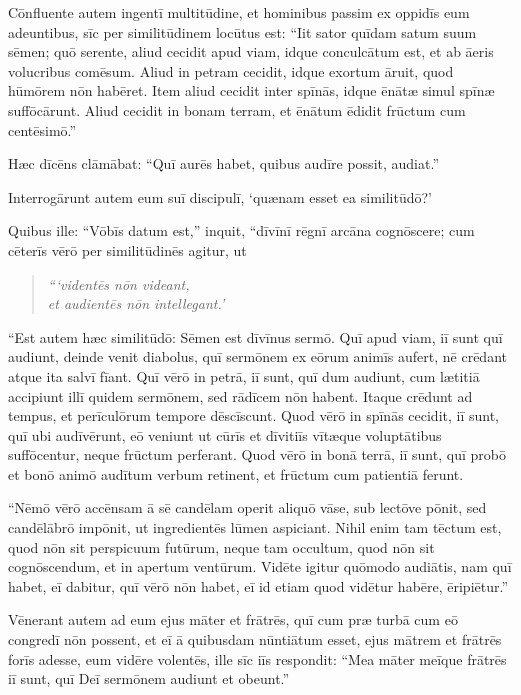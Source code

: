 \Versus Cōnfluente autem ingentī multitūdine, et hominibus passim ex oppidīs eum adeuntibus, sīc per similitūdinem locūtus est:
\Versus ``Iit sator quīdam satum suum sēmen; quō serente, aliud cecidit apud viam, idque conculcātum est, et ab āeris volucribus comēsum.
\Versus Aliud in petram cecidit, idque exortum āruit, quod hūmōrem nōn habēret.
\Versus Item aliud cecidit inter spīnās, idque ēnātæ simul spīnæ suffōcārunt.
\Versus Aliud cecidit in bonam terram, et ēnātum ēdidit frūctum cum centēsimō.''

Hæc dīcēns clāmābat: ``Quī aurēs habet, quibus audīre possit, audiat.''

\Versus Interrogārunt autem eum suī discipulī, `quænam esset ea similitūdō?'

\Versus Quibus ille: ``Vōbīs datum est,'' inquit, ``dīvīnī rēgnī arcāna cognōscere; cum cēterīs vērō per similitūdinēs agitur, ut
\begin{verse}
\begin{patverse*}
\emph{``{}`videntēs nōn videant,\\
et audientēs nōn intellegant.'}
\end{patverse*}
\end{verse}

\Versus ``Est autem hæc similitūdō: Sēmen est dīvīnus sermō.
\Versus Quī apud viam, iī sunt quī audiunt, deinde venit diabolus, quī sermōnem ex eōrum animīs aufert, nē crēdant atque ita salvī fīant.
\Versus Quī vērō in petrā, iī sunt, quī dum audiunt, cum lætitiā accipiunt illī quidem sermōnem, sed rādīcem nōn habent. Itaque crēdunt ad tempus, et perīculōrum tempore dēscīscunt.
\Versus Quod vērō in spīnās cecidit, iī sunt, quī ubi audīvērunt, eō veniunt ut cūrīs et dīvitiīs vītæque voluptātibus suffōcentur, neque frūctum perferant.
\Versus Quod vērō in bonā terrā, iī sunt, quī probō et bonō animō audītum verbum retinent, et frūctum cum patientiā ferunt.

\Versus ``Nēmō vērō accēnsam ā sē candēlam operit aliquō vāse, sub lectōve pōnit, sed candēlābrō impōnit, ut ingredientēs lūmen aspiciant.
\Versus Nihil enim tam tēctum est, quod nōn sit perspicuum futūrum, neque tam occultum, quod nōn sit cognōscendum, et in apertum ventūrum.
\Versus Vidēte igitur quōmodo audiātis, nam quī habet, eī dabitur, quī vērō nōn habet, eī id etiam quod vidētur habēre, ēripiētur.''

\Versus Vēnerant autem ad eum ejus māter et frātrēs, quī cum præ turbā cum eō congredī nōn possent,
\Versus et eī ā quibusdam nūntiātum esset, ejus mātrem et frātrēs forīs adesse, eum vidēre volentēs,
\Versus ille sīc iīs respondit: ``Mea māter meīque frātrēs iī sunt, quī Deī sermōnem audiunt et obeunt.''

